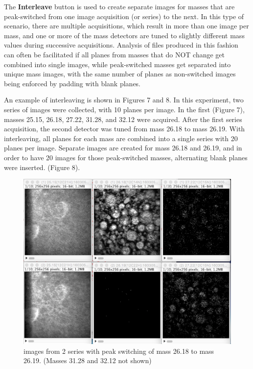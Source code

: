 \documentclass{article}
\begin{document}
	The \textbf{Interleave} button is used to create separate images for masses that are peak-switched
	 from one image acquisition (or series) to the next.  In this type of scenario, there are multiple acquisitions, 
	 which result in more than one image per mass, and one or more of the mass detectors are tuned to slightly
	 different mass values during successive acquisitions.   Analysis of files produced in this fashion can often 
	 be facilitated if all planes from masses that do NOT change get combined into single images, while 
	 peak-switched masses get separated into unique mass images, with the same number of planes as 
	 non-switched images being enforced by padding with blank planes.

	An example of interleaving is shown in Figures 7 and 8.  In this experiment, two series of images were collected, 
	with 10 planes per image.  In the first (Figure 7), masses 25.15, 26.18, 27.22, 31.28, and 32.12 were acquired.  
	After the first series acquisition, the second detector was tuned from mass 26.18 to mass 26.19.   With interleaving,
	 all planes for each mass are combined into a single series with 20 planes per image.   Separate images are 
	 created for mass 26.18 and 26.19, and in order to have 20 images for those peak-switched masses, 
	 alternating blank planes were inserted.  (Figure 8).
	
	\begin{figure}[ht]
	\centering
	\includegraphics[scale=0.68]{snapshotPeakSwitch1.png}
	\caption{images from 2 series with peak switching of mass 26.18 to mass 26.19.   (Masses 31.28 and 32.12 not shown)}
	\end{figure}
	
\end{document}
